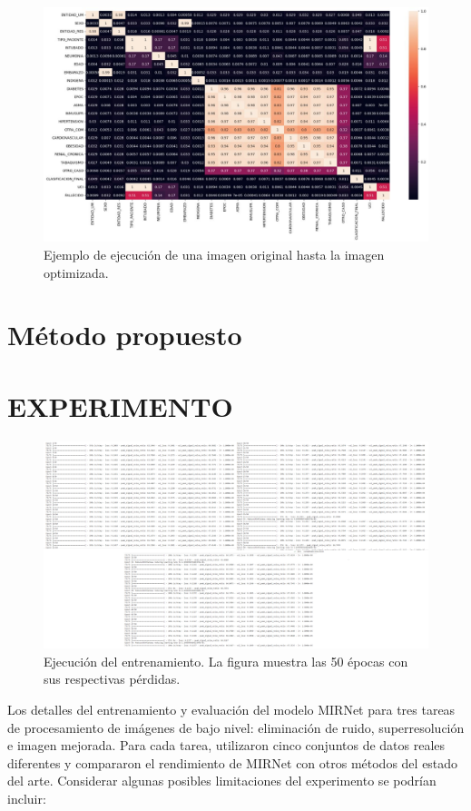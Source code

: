 \documentclass[a4paper,
               ]{jacow}
\begin{document}
\begin{figure}[!h]
    \centering
    \includegraphics*[width=.5\textwidth]{matrizdeCorrelacion}
    \caption{Ejemplo de ejecución de una imagen original hasta la imagen optimizada.}
    \label{fig:matrix_correlacion}
\end{figure}

\section{Método propuesto}


\section{EXPERIMENTO}


\begin{figure}[!h]
    \centering
    \includegraphics*[width=.9\textwidth]{entrenamiento}
    \caption{Ejecución del entrenamiento. La figura muestra las 50 épocas con sus respectivas pérdidas.     }
    \label{fig:ejem_Entrenamiento}
\end{figure}

Los detalles del entrenamiento y evaluación del modelo MIRNet para tres tareas de procesamiento de imágenes de bajo nivel: eliminación de ruido, superresolución e imagen mejorada. Para cada tarea, utilizaron cinco conjuntos de datos reales diferentes y compararon el rendimiento de MIRNet con otros métodos del estado del arte. Considerar algunas posibles limitaciones del experimento se podrían incluir:
\end{document}
